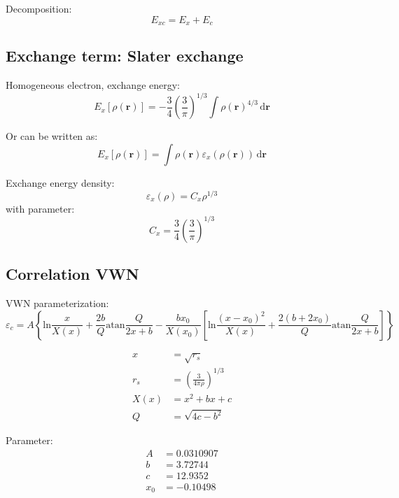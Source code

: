 Decomposition:
\begin{equation}
E_{xc} = E_{x} + E_{c}
\end{equation}

\subsection{Exchange term: Slater exchange}

Homogeneous electron, exchange energy:
\begin{equation}
E_{x}[\rho(\mathbf{r})] = -\frac{3}{4} \left(\frac{3}{\pi}\right)^{1/3}
\int \rho(\mathbf{r})^{4/3}\,\mathrm{d}\mathbf{r}
\end{equation}

Or can be written as:
\begin{equation}
E_{x}[\rho(\mathbf{r})] = \int \rho(\mathbf{r}) \varepsilon_{x}(\rho(\mathbf{r}))\,\mathrm{d}\mathbf{r}
\end{equation}

Exchange energy density:
\begin{equation}
\varepsilon_{x}(\rho) = C_{x}\rho^{1/3}
\end{equation}
with parameter:
\begin{equation}
C_{x} = \frac{3}{4}\left(\frac{3}{\pi}\right)^{1/3}  
\end{equation}


\subsection{Correlation VWN}

VWN parameterization:
\begin{equation}
\varepsilon_{c} = A \left\{
\mathrm{ln}\frac{x}{X(x)} + \frac{2b}{Q}\mathrm{atan}\frac{Q}{2x+b}
- \frac{bx_{0}}{X(x_{0})}\left[
\mathrm{ln}\frac{(x - x_0)^2}{X(x)} + \frac{2(b + 2x_0)}{Q}\mathrm{atan}\frac{Q}{2x + b}
\right]
\right\}
\end{equation}

\begin{align}
x & = \sqrt{r_{s}} \\
r_s & = \left( \frac{3}{4\pi\rho} \right)^{1/3} \\
X(x) & = x^2 + bx + c \\
Q & = \sqrt{4c - b^2}
\end{align}

Parameter:
\begin{align}
A & = 0.0310907 \\
b & = 3.72744 \\
c & = 12.9352 \\
x_0 & = -0.10498
\end{align}

